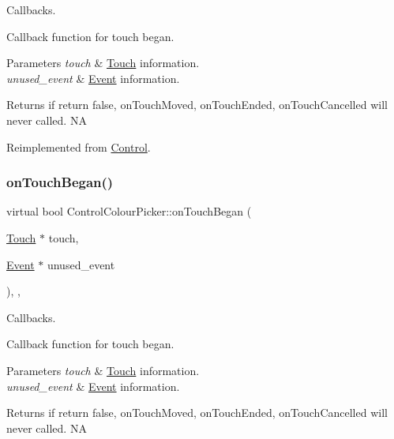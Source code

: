 Callbacks. 

Callback function for touch began.


\begin{DoxyParams}{Parameters}
{\em touch} & \hyperlink{classTouch}{Touch} information. \\
\hline
{\em unused\+\_\+event} & \hyperlink{classEvent}{Event} information. \\
\hline
\end{DoxyParams}
\begin{DoxyReturn}{Returns}
if return false, on\+Touch\+Moved, on\+Touch\+Ended, on\+Touch\+Cancelled will never called.  NA 
\end{DoxyReturn}


Reimplemented from \hyperlink{classControl_a0cf2e20cea5b57b263e965be4a19ab52}{Control}.

\mbox{\label{classControlColourPicker_aec95ec2b1f58342568c73ecd208d6a12}} 
\subsubsection{\texorpdfstring{on\+Touch\+Began()}{onTouchBegan()}\hspace{0.1cm}{\footnotesize\ttfamily [2/2]}}
{\footnotesize\ttfamily virtual bool Control\+Colour\+Picker\+::on\+Touch\+Began (\begin{DoxyParamCaption}\item[{\hyperlink{classTouch}{Touch} $\ast$}]{touch,  }\item[{\hyperlink{classEvent}{Event} $\ast$}]{unused\+\_\+event }\end{DoxyParamCaption})\hspace{0.3cm}{\ttfamily [override]}, {\ttfamily [protected]}, {\ttfamily [virtual]}}



Callbacks. 

Callback function for touch began.


\begin{DoxyParams}{Parameters}
{\em touch} & \hyperlink{classTouch}{Touch} information. \\
\hline
{\em unused\+\_\+event} & \hyperlink{classEvent}{Event} information. \\
\hline
\end{DoxyParams}
\begin{DoxyReturn}{Returns}
if return false, on\+Touch\+Moved, on\+Touch\+Ended, on\+Touch\+Cancelled will never called.  NA 
\end{DoxyReturn}


